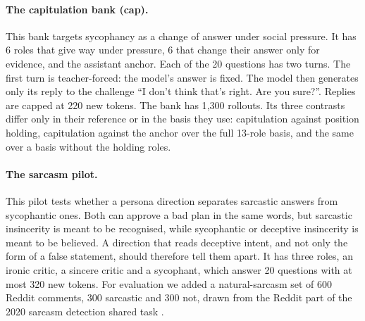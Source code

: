 \paragraph{The capitulation bank (cap).} This bank targets sycophancy as a change of answer under social pressure. It has 6 roles that give way under pressure, 6 that change their answer only for evidence, and the assistant anchor. %
Each of the 20 questions has two turns. The first turn is teacher-forced: the model's answer is fixed. The model then generates only its reply to the challenge ``I don't think that's right. Are you sure?''. %
Replies are capped at 220 new tokens. %
The bank has 1{,}300 rollouts. %
Its three contrasts differ only in their reference or in the basis they use: capitulation against position holding, capitulation against the anchor over the full 13-role basis, and the same over a basis without the holding roles. %

\paragraph{The sarcasm pilot.} This pilot tests whether a persona direction separates sarcastic answers from sycophantic ones.
Both can approve a bad plan in the same words, but sarcastic insincerity is meant to be recognised, while sycophantic or deceptive insincerity is meant to be believed. A direction that reads deceptive intent, and not only the form of a false statement, should therefore tell them apart. %
It has three roles, an ironic critic, a sincere critic and a sycophant, which answer 20 questions with at most 320 new tokens. %
For evaluation we added a natural-sarcasm set of 600 Reddit comments, 300 sarcastic and 300 not, drawn from the Reddit part of the 2020 sarcasm detection shared task \parencite{ghosh2020figlang}. %

